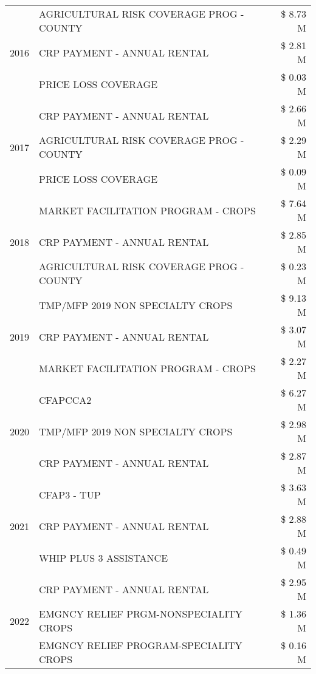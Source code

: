\begin{tabular}{llr}
\cline{1-3}
\multirow[t]{3}{*}{2016} & AGRICULTURAL RISK COVERAGE PROG - COUNTY & \$ 8.73 M \\
 & CRP PAYMENT - ANNUAL RENTAL & \$ 2.81 M \\
 & PRICE LOSS COVERAGE & \$ 0.03 M \\
\cline{1-3}
\multirow[t]{3}{*}{2017} & CRP PAYMENT - ANNUAL RENTAL & \$ 2.66 M \\
 & AGRICULTURAL RISK COVERAGE PROG - COUNTY & \$ 2.29 M \\
 & PRICE LOSS COVERAGE & \$ 0.09 M \\
\cline{1-3}
\multirow[t]{3}{*}{2018} & MARKET FACILITATION PROGRAM - CROPS & \$ 7.64 M \\
 & CRP PAYMENT - ANNUAL RENTAL & \$ 2.85 M \\
 & AGRICULTURAL RISK COVERAGE PROG - COUNTY & \$ 0.23 M \\
\cline{1-3}
\multirow[t]{3}{*}{2019} & TMP/MFP 2019 NON SPECIALTY CROPS & \$ 9.13 M \\
 & CRP PAYMENT - ANNUAL RENTAL & \$ 3.07 M \\
 & MARKET FACILITATION PROGRAM - CROPS & \$ 2.27 M \\
\cline{1-3}
\multirow[t]{3}{*}{2020} & CFAPCCA2 & \$ 6.27 M \\
 & TMP/MFP 2019 NON SPECIALTY CROPS & \$ 2.98 M \\
 & CRP PAYMENT - ANNUAL RENTAL & \$ 2.87 M \\
\cline{1-3}
\multirow[t]{3}{*}{2021} & CFAP3 - TUP & \$ 3.63 M \\
 & CRP PAYMENT - ANNUAL RENTAL & \$ 2.88 M \\
 & WHIP PLUS 3 ASSISTANCE & \$ 0.49 M \\
\cline{1-3}
\multirow[t]{3}{*}{2022} & CRP PAYMENT - ANNUAL RENTAL & \$ 2.95 M \\
 & EMGNCY RELIEF PRGM-NONSPECIALITY CROPS & \$ 1.36 M \\
 & EMGNCY RELIEF PROGRAM-SPECIALITY CROPS & \$ 0.16 M \\
\cline{1-3}
\bottomrule
\end{tabular}
